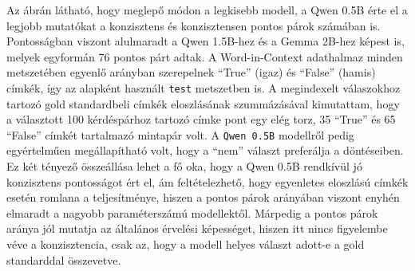 \documentclass[12pt]{report}
\begin{document}
Az ábrán látható, hogy meglepő módon a legkisebb modell, a Qwen 0.5B érte el a legjobb mutatókat a konzisztens és konzisztensen pontos párok számában is. Pontosságban viszont alulmaradt a Qwen 1.5B-hez és a Gemma 2B-hez képest is, melyek egyformán 76 pontos párt adtak.
A Word-in-Context adathalmaz minden metszetében egyenlő arányban szerepelnek ``True'' (igaz) és ``False'' (hamis) címkék, így az alapként használt \texttt{test} metszetben is. A megindexelt válaszokhoz tartozó gold standardbeli címkék eloszlásának szummázásával kimutattam, hogy a választott 100 kérdéspárhoz tartozó címke pont egy elég torz, 35 ``True'' és 65 ``False'' címkét tartalmazó mintapár volt. A \texttt{\allowbreak Qwen 0.5B} modellről pedig egyértelműen megállapítható volt, hogy a ``nem'' választ preferálja a döntéseiben. 
Ez két tényező összeállása lehet a fő oka, hogy a Qwen 0.5B rendkívül jó konzisztens pontosságot ért el, ám feltételezhető, hogy egyenletes eloszlású címkék esetén romlana a teljesítménye, hiszen a pontos párok arányában viszont enyhén elmaradt a nagyobb paraméterszámú modellektől.
Márpedig a pontos párok aránya jól mutatja az általános érvelési képességet, hiszen itt nincs figyelembe véve a konzisztencia, csak az, hogy a modell helyes választ adott-e a gold standarddal összevetve.
 
\end{document}
